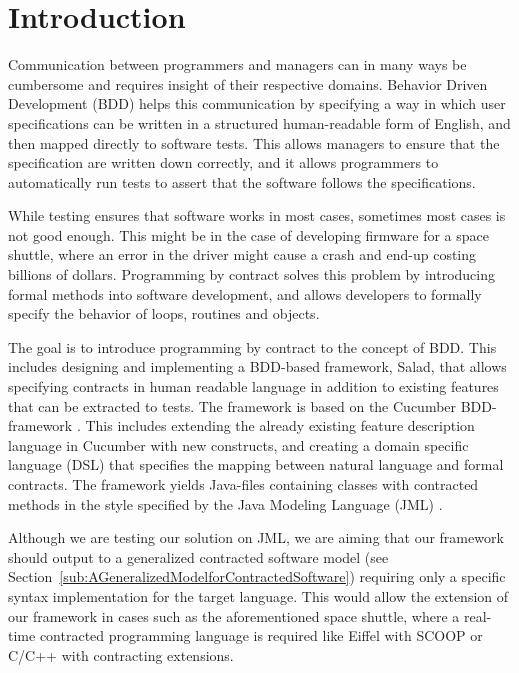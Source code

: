 \section{Introduction} %

Communication between programmers and managers can in many ways be cumbersome and requires insight of their respective domains.
Behavior Driven Development (BDD) helps this communication by specifying a way in which user specifications can be written in a structured human-readable form of English, and then mapped directly to software tests.
This allows managers to ensure that the specification are written down correctly, and it allows programmers to automatically run tests to assert that the software follows the specifications. 

While testing ensures that software works in most cases, sometimes most cases is not good enough.
This might be in the case of developing firmware for a space shuttle, where an error in the driver might cause a crash and end-up costing billions of dollars.
Programming by contract \cite{meyer1992} solves this problem by introducing formal methods into software development, 
and allows developers to formally specify the behavior of loops, routines and objects.

The goal is to introduce programming by contract to the concept of BDD.
This includes designing and implementing a BDD-based framework, Salad, that allows specifying contracts in human readable language in addition to existing features that can be extracted to tests.
The framework is based on the Cucumber BDD-framework \cite{hellesoy2012}.
This includes extending the already existing feature description language in Cucumber with new constructs, and creating a domain specific language (DSL) that specifies the mapping between natural language and formal contracts.
The framework yields Java-files containing classes with contracted methods in the style specified by the Java Modeling Language (JML) \cite{leavens2006design}.

Although we are testing our solution on JML, we are aiming that our framework should output to a generalized contracted software model (see Section~\ref{sub:AGeneralizedModelforContractedSoftware}) requiring
only a specific syntax implementation for the target language. This would allow the extension of our framework in cases such as the aforementioned space shuttle,
where a real-time contracted programming language is required like Eiffel with SCOOP\cite{eiffel2012scoop} or C/C++ with contracting extensions\cite{digitalmars2011contractprogramming}.

